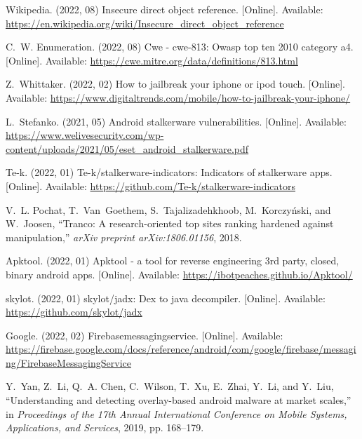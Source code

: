 \documentclass[sigconf,balance=false]{acmart}
\begin{document}
\begin{thebibliography}{100}
\BIBentryALTinterwordspacing
Wikipedia. (2022, 08) Insecure direct object reference. [Online]. Available:
  \url{https://en.wikipedia.org/wiki/Insecure_direct_object_reference}
\BIBentrySTDinterwordspacing

\BIBentryALTinterwordspacing
C.~W. Enumeration. (2022, 08) Cwe - cwe-813: Owasp top ten 2010 category a4.
  [Online]. Available: \url{https://cwe.mitre.org/data/definitions/813.html}
\BIBentrySTDinterwordspacing

\BIBentryALTinterwordspacing
Z.~Whittaker. (2022, 02) How to jailbreak your iphone or ipod touch. [Online].
  Available:
  \url{https://www.digitaltrends.com/mobile/how-to-jailbreak-your-iphone/}
\BIBentrySTDinterwordspacing

\BIBentryALTinterwordspacing
L.~Stefanko. (2021, 05) Android stalkerware vulnerabilities. [Online].
  Available:
  \url{https://www.welivesecurity.com/wp-content/uploads/2021/05/eset_android_stalkerware.pdf}
\BIBentrySTDinterwordspacing

\BIBentryALTinterwordspacing
Te-k. (2022, 01) Te-k/stalkerware-indicators: Indicators of stalkerware apps.
  [Online]. Available: \url{https://github.com/Te-k/stalkerware-indicators}
\BIBentrySTDinterwordspacing

V.~L. Pochat, T.~Van~Goethem, S.~Tajalizadehkhoob, M.~Korczy{\'n}ski, and
  W.~Joosen, ``Tranco: A research-oriented top sites ranking hardened against
  manipulation,'' \emph{arXiv preprint arXiv:1806.01156}, 2018.

\BIBentryALTinterwordspacing
Apktool. (2022, 01) Apktool - a tool for reverse engineering 3rd party, closed,
  binary android apps. [Online]. Available:
  \url{https://ibotpeaches.github.io/Apktool/}
\BIBentrySTDinterwordspacing

\BIBentryALTinterwordspacing
skylot. (2022, 01) skylot/jadx: Dex to java decompiler. [Online]. Available:
  \url{https://github.com/skylot/jadx}
\BIBentrySTDinterwordspacing

\BIBentryALTinterwordspacing
Google. (2022, 02) Firebasemessagingservice. [Online]. Available:
  \url{https://firebase.google.com/docs/reference/android/com/google/firebase/messaging/FirebaseMessagingService}
\BIBentrySTDinterwordspacing

Y.~Yan, Z.~Li, Q.~A. Chen, C.~Wilson, T.~Xu, E.~Zhai, Y.~Li, and Y.~Liu,
  ``Understanding and detecting overlay-based android malware at market
  scales,'' in \emph{Proceedings of the 17th Annual International Conference on
  Mobile Systems, Applications, and Services}, 2019, pp. 168--179.


\end{thebibliography}
\end{document}
